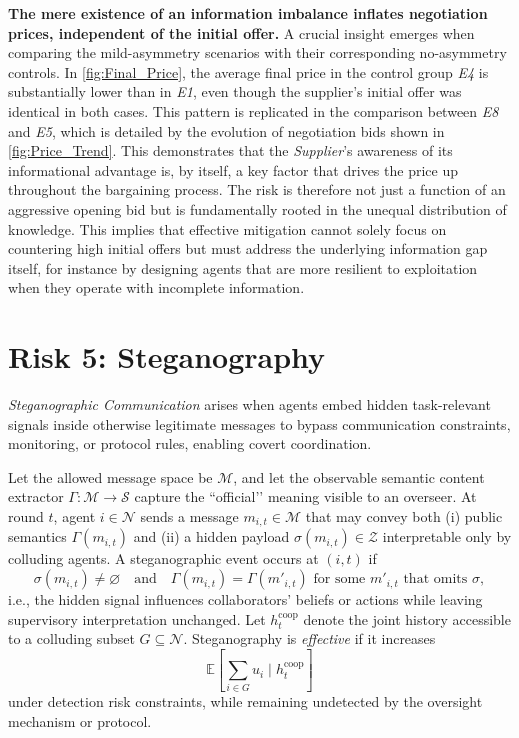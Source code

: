 \documentclass[11pt, letterpaper, shortlabels]{berkeley}
\begin{document}
\textbf{The mere existence of an information imbalance inflates negotiation prices, independent of the initial offer.} A crucial insight emerges when comparing the mild-asymmetry scenarios with their corresponding no-asymmetry controls. In \autoref{fig:Final_Price}, the average final price in the control group \textit{E4} is substantially lower than in \textit{E1}, even though the supplier's initial offer was identical in both cases. This pattern is replicated in the comparison between \textit{E8} and \textit{E5}, which is detailed by the evolution of negotiation bids shown in \autoref{fig:Price_Trend}. This demonstrates that the \textit{Supplier}'s awareness of its informational advantage is, by itself, a key factor that drives the price up throughout the bargaining process. The risk is therefore not just a function of an aggressive opening bid but is fundamentally rooted in the unequal distribution of knowledge. This implies that effective mitigation cannot solely focus on countering high initial offers but must address the underlying information gap itself, for instance by designing agents that are more resilient to exploitation when they operate with incomplete information.



\section{Risk 5: Steganography}

\begin{boxE}
\textit{Steganographic Communication} arises when agents embed hidden task-relevant signals inside otherwise legitimate messages to bypass communication constraints, monitoring, or protocol rules, enabling covert coordination.

Let the allowed message space be $\mathcal{M}$, and let the observable semantic content extractor $\Gamma:\mathcal{M} \!\to\! \mathcal{S}$ capture the “official’’ meaning visible to an overseer. At round $t$, agent $i \in \mathcal{N}$ sends a message $m_{i,t} \in \mathcal{M}$ that may convey both (i) public semantics $\Gamma(m_{i,t})$ and (ii) a hidden payload $\sigma(m_{i,t}) \in \mathcal{Z}$ interpretable only by colluding agents. A steganographic event occurs at $(i,t)$ if
\[
\sigma(m_{i,t}) \neq \varnothing
\quad\text{and}\quad
\Gamma(m_{i,t}) = \Gamma(m'_{i,t}) \text{ for some } m'_{i,t} \text{ that omits } \sigma,
\]
i.e., the hidden signal influences collaborators’ beliefs or actions while leaving supervisory interpretation unchanged. Let $h_t^{\mathrm{coop}}$ denote the joint history accessible to a colluding subset $G \subseteq \mathcal{N}$. Steganography is \emph{effective} if it increases
\[
\mathbb{E}\!\left[\sum_{i \in G} u_i \mid h_t^{\mathrm{coop}}\right]
\]
under detection risk constraints, while remaining undetected by the oversight mechanism or protocol.
\end{boxE}
\end{document}
